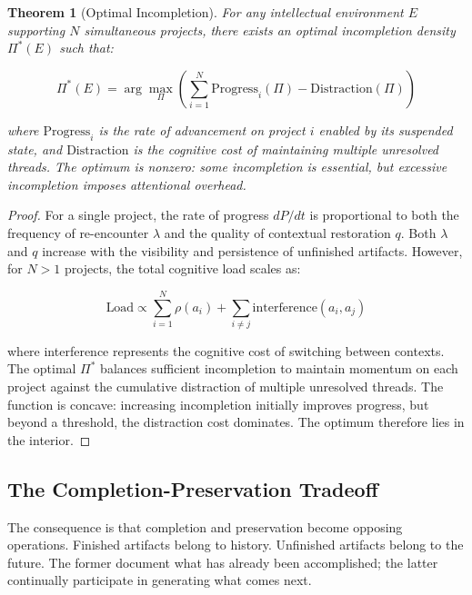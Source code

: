 \documentclass[12pt,oneside]{article}
\newtheorem{theorem}[definition]{Theorem}
\theoremstyle{remark}
\begin{document}
\begin{theorem}[Optimal Incompletion]
For any intellectual environment $E$ supporting $N$ simultaneous projects, there exists an optimal incompletion density $\Pi^*(E)$ such that:

\begin{equation}
\Pi^*(E) = \arg\max_{\Pi} \left( \sum_{i=1}^{N} \text{Progress}_i(\Pi) - \text{Distraction}(\Pi) \right)
\end{equation}

where $\text{Progress}_i$ is the rate of advancement on project $i$ enabled by its suspended state, and $\text{Distraction}$ is the cognitive cost of maintaining multiple unresolved threads. The optimum is nonzero: some incompletion is essential, but excessive incompletion imposes attentional overhead.
\end{theorem}

\begin{proof}
For a single project, the rate of progress $dP/dt$ is proportional to both the frequency of re-encounter $\lambda$ and the quality of contextual restoration $q$. Both $\lambda$ and $q$ increase with the visibility and persistence of unfinished artifacts. However, for $N > 1$ projects, the total cognitive load scales as:

\begin{equation}
\text{Load} \propto \sum_{i=1}^{N} \rho(a_i) + \sum_{i \neq j} \text{interference}(a_i, a_j)
\end{equation}

where interference represents the cognitive cost of switching between contexts. The optimal $\Pi^*$ balances sufficient incompletion to maintain momentum on each project against the cumulative distraction of multiple unresolved threads. The function is concave: increasing incompletion initially improves progress, but beyond a threshold, the distraction cost dominates. The optimum therefore lies in the interior.
\end{proof}

\subsection{The Completion-Preservation Tradeoff}

The consequence is that completion and preservation become opposing operations. Finished artifacts belong to history. Unfinished artifacts belong to the future. The former document what has already been accomplished; the latter continually participate in generating what comes next.
\end{document}
